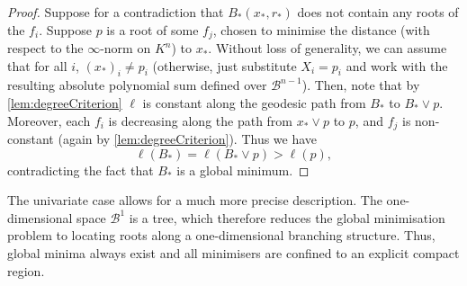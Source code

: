 \documentclass[10pt]{article}
\theoremstyle{definition}
\begin{document}
\begin{proof}
    Suppose for a contradiction that $B_*(x_*, r_*)$ does not contain any roots of the $f_i$.
    Suppose $p$ is a root of some $f_j$, chosen to minimise the distance (with respect to the $\infty$-norm on $K^n$) to $x_*$. Without loss of generality, we can assume that for all $i$, $(x_*)_i \ne p_i$ (otherwise, just substitute $X_i = p_i$ and work with the resulting absolute polynomial sum defined over $\mathcal B ^ {n-1}$). Then, note that by \cref{lem:degreeCriterion} $\ell$ is constant along the geodesic path from $B_*$ to $B_* \vee p$. Moreover, each $f_i$ is decreasing along the path from $x_* \vee p$ to $p$, and $f_j$ is non-constant (again by \cref{lem:degreeCriterion}). Thus we have
    $$
        \ell(B_*) = \ell(B_* \vee p) > \ell(p),
    $$
    contradicting the fact that $B_*$ is a global minimum.
\end{proof}

The univariate case allows for a much more precise description. The one-dimensional space $\mathcal{B}^1$ is a tree, which therefore reduces the global minimisation problem to locating roots along a one-dimensional branching structure. Thus, global minima always exist and all minimisers are confined to an explicit compact region.
\end{document}
